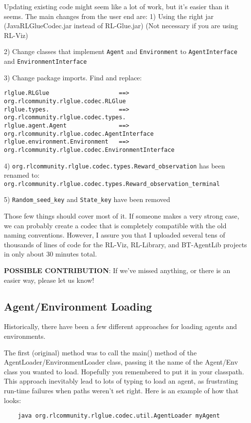 \documentclass[11pt]{article}
\begin{document}
Updating existing code might seem like a lot of work, but it's easier than it seems.  The main changes from the user end are:
1) Using the right jar (JavaRLGlueCodec.jar instead of RL-Glue.jar)  (Not necessary if you are using RL-Viz)



2) Change classes that implement \texttt{Agent} and \texttt{Environment} to \texttt{AgentInterface} and \texttt{EnvironmentInterface}

3) Change package imports.  Find and replace:
\begin{verbatim}
rlglue.RLGlue                    ==>    org.rlcommunity.rlglue.codec.RLGlue
rlglue.types.                    ==>    org.rlcommunity.rlglue.codec.types.
rlglue.agent.Agent               ==>    org.rlcommunity.rlglue.codec.AgentInterface
rlglue.environment.Environment   ==>    org.rlcommunity.rlglue.codec.EnvironmentInterface
\end{verbatim}

4) \texttt{org.rlcommunity.rlglue.codec.types.Reward\_observation} has been renamed to:\\
\texttt{org.rlcommunity.rlglue.codec.types.Reward\_observation\_terminal}

5) \texttt{Random\_seed\_key} and \texttt{State\_key} have been removed

Those few things should cover most of it.  If someone makes a very strong case, we can probably create a codec that is completely compatible with the old naming conventions.  However, I assure you that I uploaded
several tens of thousands of lines of code for the RL-Viz, RL-Library, and BT-AgentLib projects in only about 30 minutes total.

\textbf{POSSIBLE CONTRIBUTION}: If we've missed anything, or there is an easier way, please let us know!

\subsection{Agent/Environment Loading}
Historically, there have been a few different approaches for loading agents and environments.

The first (original) method was to call the main() method of the AgentLoader/EnvironmentLoader class, passing it the name of the 
Agent/Env class you wanted to load.  Hopefully you remembered to put it in your classpath.  This approach inevitably lead to lots of typing to load an agent, as frustrating run-time failures when paths weren't set right.
Here is an example of how that looks:
\begin{verbatim}
	java org.rlcommunity.rlglue.codec.util.AgentLoader myAgent
\end{verbatim}
\end{document}
